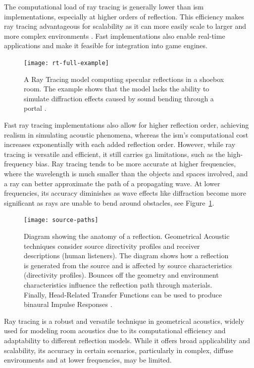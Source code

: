 The computational load of ray tracing is generally lower than \acrshort{ism} implementations, especially at higher orders of reflection. This efficiency makes ray tracing advantageous for scalability as it can more easily scale to larger and more complex environments \citep{schissler2014high}.
Fast implementations also enable real-time applications and make it feasible for integration into game engines.
\begin{figure}[htbp]
    \centering
    \texttt{[image: rt-full-example]}
    \caption[Ray Tracing, shoebox room demonstration]{A Ray Tracing model computing specular reflections in a shoebox room. The example shows that the model lacks the ability to simulate diffraction effects caused by sound bending through a portal \citep{funkhouser:inria-00606737}.}\label{fig:ray-tracing-diagram3}
\end{figure}
Fast ray tracing implementations also allow for higher reflection order, achieving realism in simulating acoustic phenomena, whereas the \acrshort{ism}'s computational cost increases exponentially with each added reflection order.
However, while ray tracing is versatile and efficient, it still carries \acrshort{ga} limitations, such as the high-frequency bias. Ray tracing tends to be more accurate at higher frequencies, where the wavelength is much smaller than the objects and spaces involved, and a ray can better approximate the path of a propagating wave. At lower frequencies, its accuracy diminishes as wave effects like diffraction become more significant as rays are unable to bend around obstacles, see Figure~\ref{fig:ray-tracing-diagram3}.

\begin{figure}[htbp]
    \centering
    \texttt{[image: source-paths]}
    \caption[Geometrical Acoustic source paths visualisation]{Diagram showing the anatomy of a reflection. Geometrical Acoustic techniques consider source directivity profiles and receiver descriptions (human listeners). The diagram shows how a reflection is generated from the source and is affected by source characteristics (directivity profiles). Bounces off the geometry and environment characteristics influence the reflection path through materials. Finally, Head-Related Transfer Functions can be used to produce binaural Impulse Responses \citep{schroder2011physically}.}\label{fig:ga-source-paths}
\end{figure}

Ray tracing is a robust and versatile technique in geometrical acoustics, widely used for modeling room acoustics due to its computational efficiency and adaptability to different reflection models. While it offers broad applicability and scalability, its accuracy in certain scenarios, particularly in complex, diffuse environments and at lower frequencies, may be limited.


